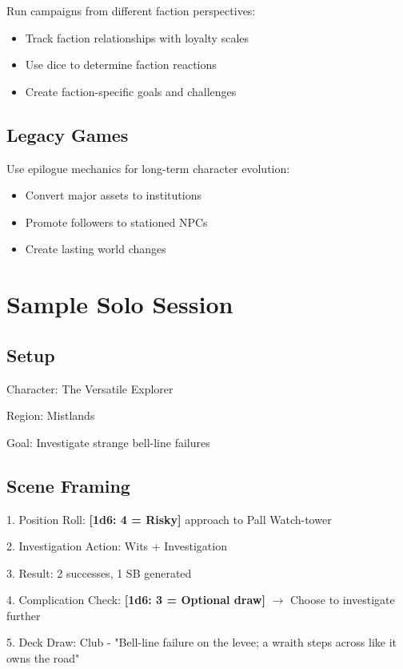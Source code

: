 \documentclass[11pt]{article}
\newcommand{\dice}[1]{\textbf{[1d6: #1]}}
\begin{document}
Run campaigns from different faction perspectives:
\begin{itemize}
    \item Track faction relationships with loyalty scales
    \item Use dice to determine faction reactions
    \item Create faction-specific goals and challenges
\end{itemize}

\subsection{Legacy Games}

Use epilogue mechanics for long-term character evolution:
\begin{itemize}
    \item Convert major assets to institutions
    \item Promote followers to stationed NPCs
    \item Create lasting world changes
\end{itemize}

\section{Sample Solo Session}

\subsection{Setup}

Character: The Versatile Explorer

Region: Mistlands

Goal: Investigate strange bell-line failures

\subsection{Scene Framing}

1. Position Roll: \dice{4 = Risky} approach to Pall Watch-tower

2. Investigation Action: Wits + Investigation

3. Result: 2 successes, 1 SB generated

4. Complication Check: \dice{3 = Optional draw} $\rightarrow$ Choose to investigate further

5. Deck Draw: Club - "Bell-line failure on the levee; a wraith steps across like it owns the road"
\end{document}
